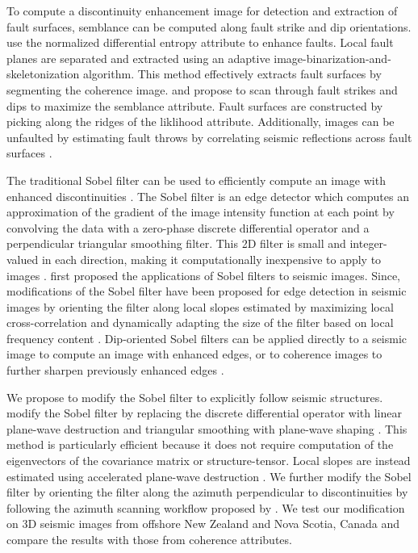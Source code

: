 To compute a discontinuity enhancement image for detection and extraction of fault surfaces, semblance can be computed along fault strike and dip orientations.
\cite{cohen} use the normalized differential entropy attribute to enhance faults.
Local fault planes are separated and extracted using an adaptive image-binarization-and-skeletonization algorithm.
This method effectively extracts fault surfaces by segmenting the coherence image.
\cite{hale13} and \cite{wu16a} propose to scan through fault strikes and dips to maximize the semblance attribute.
Fault surfaces are constructed by picking along the ridges of the liklihood attribute.
Additionally, images can be unfaulted by estimating fault throws by correlating seismic reflections across fault surfaces \cite[]{wu16b}.

The traditional Sobel filter can be used to efficiently compute an image with enhanced discontinuities \cite[]{sobel}.
The Sobel filter is an edge detector which computes an approximation of the gradient of the image intensity function at each point by convolving the data with a zero-phase discrete differential operator and a perpendicular triangular smoothing filter.
This 2D filter is small and integer-valued in each direction, making it computationally inexpensive to apply to images \cite[]{ogorman}.
\cite{luo} first proposed the applications of Sobel filters to seismic images.
Since, modifications of the Sobel filter have been proposed for edge detection in seismic images by orienting the filter along local slopes estimated by maximizing local cross-correlation and dynamically adapting the size of the filter based on local frequency content \cite[]{aqrawi11a,aqrawi11b,aqrawi14}.
Dip-oriented Sobel filters can be applied directly to a seismic image to compute an image with enhanced edges, or to coherence images to further sharpen previously enhanced edges \cite[]{chopra14}.

We propose to modify the Sobel filter to explicitly follow seismic structures. 
\cite{phillips} modify the Sobel filter by replacing the discrete differential operator with linear plane-wave destruction \cite[]{fomel02} and triangular smoothing with plane-wave shaping \cite[]{fomel07,swindeman}.
This method is particularly efficient because it does not require computation of the eigenvectors of the covariance matrix or structure-tensor.
Local slopes are instead estimated using accelerated plane-wave destruction \cite[]{apwd}.
We further modify the Sobel filter by orienting the filter along the azimuth perpendicular to discontinuities by following the azimuth scanning workflow proposed by \cite{merzlikin}.
We test our modification on 3{D} seismic images from offshore New Zealand and Nova Scotia, Canada and compare the results with those from coherence attributes.


